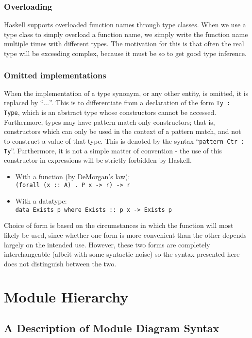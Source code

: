 \subsubsection{Overloading}
Haskell supports overloaded function names through type classes. When we use a 
type 
class to simply overload a function name, we simply write the function name
multiple times with different types. The motivation for this is that often the 
real type will be exceeding complex, because it must be so to get good type 
inference. 

 

\subsubsection{Omitted implementations}
When the implementation of a type synonym, or any other entity, is omitted, it
is replaced by ``$\ldots$''. This is to differentiate from a declaration of the 
form
\lstinline!Ty : Type!, which is an abstract type whose constructors cannot be
accessed. Furthermore, types may have pattern-match-only constructors; that is,
constructors which can only be used in the context of a pattern match, and not
to construct a value of that type. This is denoted by the syntax
``\lstinline!pattern Ctr : Ty!''. Furthermore, it is not a simple matter of
convention - the use of this constructor in expressions will be strictly
forbidden by Haskell.


\begin{itemize}
    \item With a function (by DeMorgan's law): \\ \texttt{(forall (x :: A) . P 
    x -> r) -> r}
    \item With a datatype: \\ \texttt{data Exists p where Exists :: p x -> 
    Exists p}
\end{itemize} 

Choice of form is based on the circumstances in which the function
will most likely be used, since whether one form is more convenient than the
other depends largely on the intended use. However, these two forms are
completely interchangeable (albeit with some syntactic noise) so the syntax
presented here does not distinguish between the two. 

\section{Module Hierarchy}
\subsection{A Description of Module Diagram Syntax}\label{subsec:ModuleSyntax}

